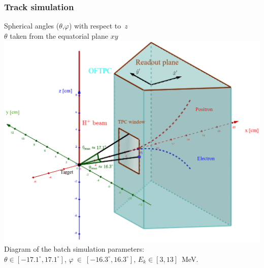 \documentclass{beamer}
\begin{document}
	\begin{frame}
		\frametitle{Track simulation}
		\centering
		\large{Spherical angles ($\theta$,$\varphi$) with respect to~$z$}\\
		\small{$\theta$ taken from the equatorial plane $xy$}
		\centering
		\textcolor{white}{aaaaaaaa}\includegraphics[height= 0.61 \textheight]{../images/tpc_micro_simulation.png}\newline
		\small{Diagram of the batch simulation parameters:\\ $\theta\in[-17.1^\circ,17.1^\circ]$, $\varphi~\in~[-16.3^\circ,16.3^\circ]$, $ E_k \in [3,13] $~MeV.}
	\end{frame}
	
\end{document}
